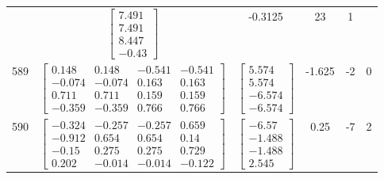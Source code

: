 \documentclass[a4paper,12pt]{article}
\begin{document}
\begin{tabular}{c c c c c c}
&
$\begin{bmatrix} 7.491 \\ 7.491 \\ 8.447 \\ -0.43 \end{bmatrix}$
&
-0.3125
&
23
&
1
\\
589
&
$\begin{bmatrix} 0.148 & 0.148 & -0.541 & -0.541 \\ -0.074 & -0.074 & 0.163 & 0.163 \\ 0.711 & 0.711 & 0.159 & 0.159 \\ -0.359 & -0.359 & 0.766 & 0.766 \end{bmatrix}$
&
$\begin{bmatrix} 5.574 \\ 5.574 \\ -6.574 \\ -6.574 \end{bmatrix}$
&
-1.625
&
-2
&
0
\\
590
&
$\begin{bmatrix} -0.324 & -0.257 & -0.257 & 0.659 \\ -0.912 & 0.654 & 0.654 & 0.14 \\ -0.15 & 0.275 & 0.275 & 0.729 \\ 0.202 & -0.014 & -0.014 & -0.122 \end{bmatrix}$
&
$\begin{bmatrix} -6.57 \\ -1.488 \\ -1.488 \\ 2.545 \end{bmatrix}$
&
0.25
&
-7
&
2
\\
\end{tabular} \egroup \newpage
\end{document}
